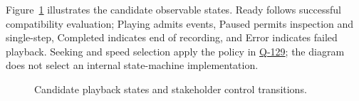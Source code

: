 \normalsize
Figure~\ref{Figure:PlaybackStates} illustrates the candidate observable states. Ready follows successful compatibility evaluation; Playing admits events, Paused permits inspection and single-step, Completed indicates end of recording, and Error indicates failed playback. Seeking and speed selection apply the policy in \hyperref[Question:Q-129]{Q-129}; the diagram does not select an internal state-machine implementation.
\begin{figure}[htbp]\centering
\resizebox{0.96\linewidth}{!}{}
\caption{Candidate playback states and stakeholder control transitions.}\label{Figure:PlaybackStates}
\end{figure}
